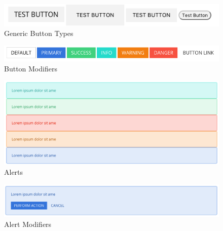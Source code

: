 \begin{figure}[h]
\caption{Generic Button Types}
  \label{fig:genButtons}
\includegraphics[scale=0.5]{../public/images/generic-buttonsa}
\centering
\end{figure}



\begin{figure}[h]
\caption{Button Modifiers}
  \label{fig:buttonMods}
\includegraphics[scale=0.5]{../public/images/button-modifiers}
\centering
\end{figure}

\begin{figure}[h]
\caption{Alerts}
  \label{fig:alerts}
\includegraphics[scale=0.3]{../public/images/alertd}
\centering
\end{figure}

\begin{figure}[h]
\caption{Alert Modifiers}
  \label{fig:AlertModifiers}
\includegraphics[scale=0.3]{../public/images/addtoalert}
\centering
\end{figure}

